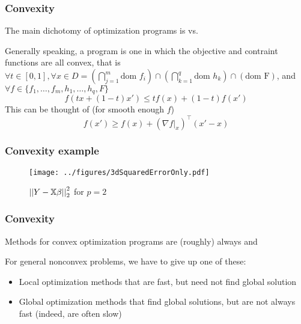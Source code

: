 \documentclass{beamer}
\begin{document}
\begin{frame}[fragile]
\frametitle{Convexity}
The main dichotomy of optimization programs is   vs. 
\vsp

Generally speaking, a  program is one in which the objective and contraint functions are all convex,
that is $\forall t \in [0,1], \forall x \in D = \left(\bigcap_{j =1}^m \textrm{dom } f_i \right) 
\cap \left(\bigcap_{k=1}^q \textrm{dom } h_k\right) \cap \left(\textrm{dom F}\right)$, and 
$\forall f \in \{ f_1,\ldots, f_m, h_1,\ldots,h_q, F\}$
\[
f(tx + (1-t)x') \leq tf(x) + (1-t)f(x')
\]
This can be thought of (for smooth enough $f$)
\[
f(x') \geq f(x) + (\nabla f|_x)^{\top} (x' - x) 
\]


\end{frame}

\begin{frame}[fragile]
\frametitle{Convexity example}

\begin{figure}[!h]
\texttt{[image: ../figures/3dSquaredErrorOnly.pdf]}
\caption*{$\left|\left| Y - \mathbb{X}\beta \right|\right|_2^2$ for $p = 2$}
\end{figure}

\end{frame}



\begin{frame}[fragile]
\frametitle{Convexity}
Methods  for convex optimization programs are (roughly) always  and 

\vsp
For general nonconvex problems, we have to give up one of these:
\begin{itemize}
\item Local optimization methods that are fast, but need not find global solution

\item Global optimization methods that find global solutions, but
are not always fast (indeed, are often slow)

\end{itemize}
\end{frame}
\end{document}
